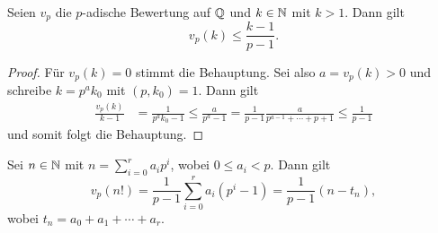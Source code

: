 \begin{Lem}
Seien $v_p$ die $p$-adische Bewertung auf $\mathbb{Q}$ und $k \in \mathbb{N}$ mit $k >1$. Dann gilt
\[ v_p(k) \leq \frac{k-1}{p-1}.
\]
\end{Lem}

\begin{proof}
Für $v_p(k) = 0$ stimmt die Behauptung. Sei also $a= v_p(k) >0$ und schreibe $k = p^a k_0$ mit $(p,k_0)=1$. Dann gilt
\begin{align*}
\frac{v_p(k)}{k-1}
&= \frac{1}{p^ak_0-1}
\leq \frac{a}{p^a-1}
= \frac{1}{p-1}  \frac{a}{p^{a-1}+ \cdots + p +1}
\leq \frac{1}{p-1}
\end{align*}
und somit folgt die Behauptung.
\end{proof}

\begin{Lem}
Sei $n\in\mathbb{N}$ mit $n = \sum_{i=0}^{r} a_ip^i$, wobei $0 \leq a_i < p$. Dann gilt
\[ v_p(n!)
= \frac{1}{p-1} \sum_{i=0}^{r} a_i \left( p^i-1 \right)
= \frac{1}{p-1} (n-t_n),
\]
wobei $t_n = a_0 + a_1 + \cdots + a_r$.
\end{Lem}














